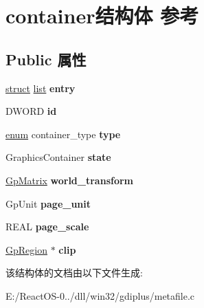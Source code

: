\hypertarget{structcontainer}{}\section{container结构体 参考}
\label{structcontainer}
\subsection*{Public 属性}
\begin{DoxyCompactItemize}
\item 
\mbox{\label{structcontainer_a585f9df9b4a4b5e197332a175d8110d0}} 
\hyperlink{interfacestruct}{struct} \hyperlink{classlist}{list} {\bfseries entry}
\item 
\mbox{\label{structcontainer_a14d87432c0ec83e3974b7a15a2c11410}} 
D\+W\+O\+RD {\bfseries id}
\item 
\mbox{\label{structcontainer_a912d2ded1fe92915886702e67b712043}} 
\hyperlink{interfaceenum}{enum} container\+\_\+type {\bfseries type}
\item 
\mbox{\label{structcontainer_aefe69d18795eba0509a97d4143de289b}} 
Graphics\+Container {\bfseries state}
\item 
\mbox{\label{structcontainer_aac7cf011fdfd4bc9d3c2eba4e51afcb7}} 
\hyperlink{struct_gp_matrix}{Gp\+Matrix} {\bfseries world\+\_\+transform}
\item 
\mbox{\label{structcontainer_a6193515d3b6b5db3b795c7bdab0fb56e}} 
Gp\+Unit {\bfseries page\+\_\+unit}
\item 
\mbox{\label{structcontainer_a40d512f86adee0b77b29340ec6af702d}} 
R\+E\+AL {\bfseries page\+\_\+scale}
\item 
\mbox{\label{structcontainer_a59358187b8f4b58647d947a12e9851eb}} 
\hyperlink{struct_gp_region}{Gp\+Region} $\ast$ {\bfseries clip}
\end{DoxyCompactItemize}


该结构体的文档由以下文件生成\+:\begin{DoxyCompactItemize}
\item 
E\+:/\+React\+O\+S-\/0../dll/win32/gdiplus/metafile.\+c\end{DoxyCompactItemize}
